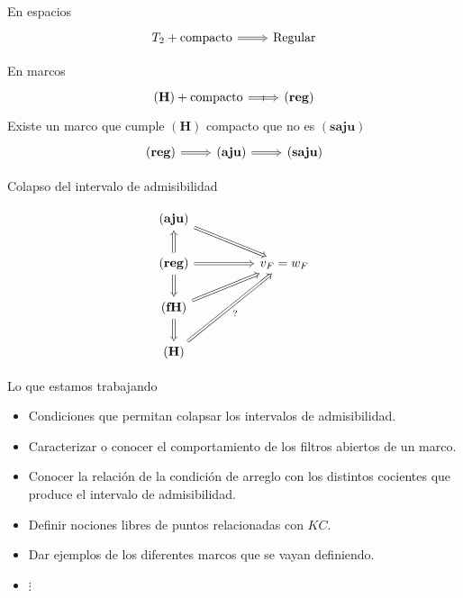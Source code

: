 \documentclass[compress,12pt]{beamer}
\begin{document}
\begin{frame}[fragile]
    En espacios
\[\begin{tikzcd}
	{T_2+\mbox{compacto}} & {\mbox{Regular}}
	\arrow[Rightarrow, from=1-1, to=1-2]
\end{tikzcd}\]

En marcos
\[\begin{tikzcd}
	{\mathbf{(H)}+\mbox{compacto}} & {\mathbf{(reg)}}
	\arrow["\shortmid"{marking}, Rightarrow, from=1-1, to=1-2]
\end{tikzcd}\]
Existe un marco que cumple $\mathbf{(H)}$ compacto que no es $\mathbf{(saju)}$
\[\begin{tikzcd}
	{\mathbf{(reg)}} & {\mathbf{(aju)}} & {\mathbf{(saju)}}
	\arrow[Rightarrow, from=1-1, to=1-2]
	\arrow[Rightarrow, from=1-2, to=1-3]
\end{tikzcd}\]
\end{frame}
    
 \begin{frame}[fragile]{Colapso del intervalo de admisibilidad}

    \[\begin{tikzcd}
	{\mathbf{(aju)}} \\
	{\mathbf{(reg)}} && {v_F=w_F} \\
	{\mathbf{(fH)}} \\
	{\mathbf{(H)}}
	\arrow[Rightarrow, from=1-1, to=2-3]
	\arrow[Rightarrow, from=2-1, to=1-1]
	\arrow[Rightarrow, from=2-1, to=2-3]
	\arrow[Rightarrow, from=2-1, to=3-1]
	\arrow[Rightarrow, from=3-1, to=2-3]
	\arrow[Rightarrow, from=3-1, to=4-1]
	\arrow["{?}"', Rightarrow, from=4-1, to=2-3]
\end{tikzcd}\]
    \end{frame}

\begin{frame}{Lo que estamos trabajando}
\begin{itemize}
\item Condiciones que permitan colapsar los intervalos de admisibilidad.
\item<2-> Caracterizar o conocer el comportamiento de los filtros abiertos de un marco.
\item<3-> Conocer la relación de la condición de arreglo con los distintos cocientes que produce el intervalo de admisibilidad.
\item<4-> Definir nociones libres de puntos relacionadas con $KC$.
\item<5-> Dar ejemplos de los diferentes marcos que se vayan definiendo.
\item<-6> $\vdots$
\end{itemize}
\end{frame}
\end{document}
